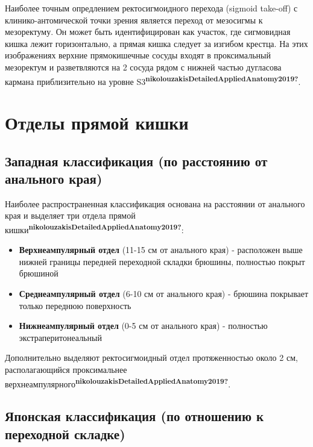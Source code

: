 \documentclass[
  russian,
  12pt,
  a4paper,
]{report}
\providecommand{\tightlist}{%
  \setlength{\itemsep}{0pt}\setlength{\parskip}{0pt}}
\begin{document}
Наиболее точным опредлением ректосигмоидного перехода (sigmoid take-off)
с клинико-антомической точки зрения является переход от мезосигмы к
мезоректуму. Он может быть идентифицирован как участок, где сигмовидная
кишка лежит горизонтально, а прямая кишка следует за изгибом крестца. На
этих изображениях верхние прямокишечные сосуды входят в проксимальный
мезоректум и разветвляются на 2 сосуда рядом с нижней частью дугласова
кармана приблизительно на уровне
S3\textsuperscript{\textbf{nikolouzakisDetailedAppliedAnatomy2019?}}.

\section{Отделы прямой
кишки}\label{ux43eux442ux434ux435ux43bux44b-ux43fux440ux44fux43cux43eux439-ux43aux438ux448ux43aux438}

\subsection{Западная классификация (по расстоянию от анального
края)}\label{ux437ux430ux43fux430ux434ux43dux430ux44f-ux43aux43bux430ux441ux441ux438ux444ux438ux43aux430ux446ux438ux44f-ux43fux43e-ux440ux430ux441ux441ux442ux43eux44fux43dux438ux44e-ux43eux442-ux430ux43dux430ux43bux44cux43dux43eux433ux43e-ux43aux440ux430ux44f}

Наиболее распространенная классификация основана на расстоянии от
анального края и выделяет три отдела прямой
кишки\textsuperscript{\textbf{nikolouzakisDetailedAppliedAnatomy2019?}}:

\begin{itemize}
\tightlist
\item
  \textbf{Верхнеампулярный отдел} (11-15 см от анального края) -
  расположен выше нижней границы передней переходной складки брюшины,
  полностью покрыт брюшиной
\item
  \textbf{Среднеампулярный отдел} (6-10 см от анального края) - брюшина
  покрывает только переднюю поверхность
\item
  \textbf{Нижнеампулярный отдел} (0-5 см от анального края) - полностью
  экстраперитонеальный
\end{itemize}

Дополнительно выделяют ректосигмоидный отдел протяженностью около 2 см,
располагающийся проксимальнее
верхнеампулярного\textsuperscript{\textbf{nikolouzakisDetailedAppliedAnatomy2019?}}.

\subsection{Японская классификация (по отношению к переходной
складке)}\label{ux44fux43fux43eux43dux441ux43aux430ux44f-ux43aux43bux430ux441ux441ux438ux444ux438ux43aux430ux446ux438ux44f-ux43fux43e-ux43eux442ux43dux43eux448ux435ux43dux438ux44e-ux43a-ux43fux435ux440ux435ux445ux43eux434ux43dux43eux439-ux441ux43aux43bux430ux434ux43aux435}
\end{document}
